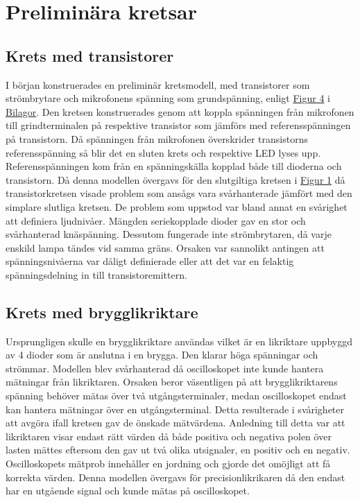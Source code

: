 \documentclass[12pt]{report}
\begin{document}
\section{Preliminära kretsar}
\label{sec:prel}
\subsection{Krets med transistorer}
I början konstruerades en preliminär kretsmodell, med transistorer som strömbrytare och mikrofonens spänning som grundspänning, enligt \hyperref[fig:bil1]{Figur 4} i \hyperref[chap:bilagor]{Bilagor}. Den kretsen konstruerades genom att koppla spänningen från mikrofonen till grindterminalen på respektive transistor som jämförs med referensspänningen på transistorn. Då spänningen från mikrofonen överskrider transistorns referensspänning så blir det en sluten krets och respektive LED lyses upp. Referensspänningen kom från en spänningskälla kopplad både till dioderna och transistorn. Då denna modellen övergavs för den slutgiltiga kretsen i \hyperref[fig:circuit]{Figur 1} då transistorkretsen visade problem som ansågs vara svårhanterade jämfört med den simplare slutliga kretsen. De problem som uppstod var bland annat en svårighet att definiera ljudnivåer. Mängden seriekopplade dioder gav en stor och svårhanterad knäspänning. Dessutom fungerade inte strömbrytaren, då varje enskild lampa tändes vid samma gräns. Orsaken var sannolikt antingen att spänningsnivåerna var dåligt definierade eller att det var en felaktig spänningsdelning in till transistoremittern.

\subsection{Krets med brygglikriktare}
Ursprungligen skulle en brygglikriktare användas vilket är en likriktare uppbyggd av 4 dioder som är anslutna i en brygga. Den klarar höga spänningar och strömmar. Modellen blev svårhanterad då oscilloskopet inte kunde hantera mätningar från likriktaren. Orsaken beror väsentligen på att brygglikriktarens spänning behöver mätas över två utgångsterminaler, medan oscilloskopet endast kan hantera mätningar över en utgångsterminal. Detta resulterade i svårigheter att avgöra ifall kretsen gav de önskade mätvärdena. Anledning till detta var att likriktaren visar endast rätt värden då både positiva och negativa polen över lasten mättes eftersom den gav ut två olika utsignaler, en positiv och en negativ. Oscilloskopets mätprob innehåller en jordning och gjorde det omöjligt att få korrekta värden. Denna modellen övergavs för precisionlikrikaren då den endast har en utgående signal och kunde mätas på oscilloskopet.
\\\\\\\\\\\
\end{document}
